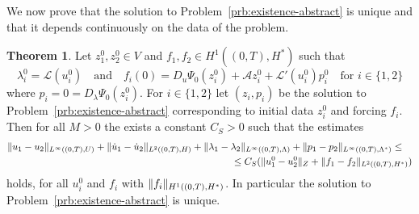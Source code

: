 \documentclass[a4paper,10pt,oneside]{amsbook}
\numberwithin{section}{chapter}
\numberwithin{equation}{chapter}
\theoremstyle{definition}
\newtheorem{thm}[prop]{Theorem}
\DeclarePairedDelimiter{\norm}{\lVert}{\rVert}
\begin{document}
We now prove that the solution to Problem~\ref{prb:existence-abstract} is unique and that it depends continuously on the data of the problem.
\begin{thm}
Let $z_1^0,z_2^0\in V$ and $f_1,f_2\in H^1((0,T),H^*)$ such that
\[
\lambda_i^0=\mathcal{L}(u_i^0)\quad\text{and}\quad f_i(0)=D_u\Psi_0(z_i^0)+\mathcal{A}z_i^0+\mathcal{L}'(u_i^0)p_i^0\quad\text{for $i\in\{1,2\}$}
\]
where $p_i=0=D_\lambda\Psi_0(z_i^0)$. For $i\in\{1,2\}$ let $(z_i,p_i)$ be the solution to Problem~\ref{prb:existence-abstract} corresponding to initial data $z_i^0$ and forcing $f_i$. Then for all $M>0$ the exists a constant $C_S>0$ such that the estimates
\[
\begin{multlined}
\norm{u_1-u_2}_{L^\infty((0,T),U)}+\norm{\dot u_1-\dot u_2}_{L^2((0,T),H)}+\norm{\lambda_1-\lambda_2}_{L^\infty((0,T),\Lambda)}+\norm{p_1-p_2}_{L^\infty((0,T),\Lambda^*)}\le\\
\le C_S(\norm{u_1^0-u_2^0}_Z+\norm{f_1-f_2}_{L^2((0,T),H^*)})
\end{multlined}
\]
holds, for all $u_i^0$ and $f_i$ with $\norm{f_i}_{H^1((0,T),H^*)}$. In particular the solution to Problem~\ref{prb:existence-abstract} is unique.
\end{thm}
\end{document}
